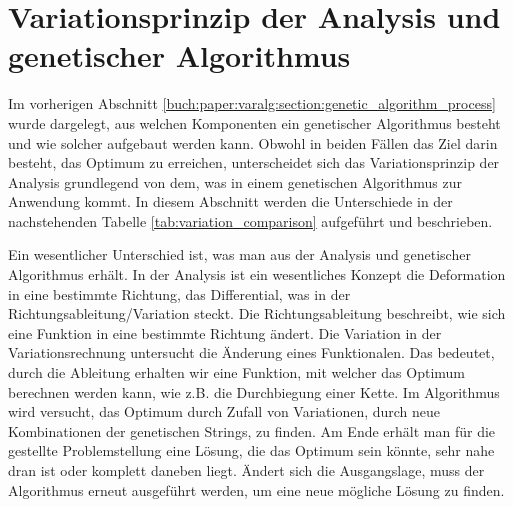 %
%
%
%
\section{Variationsprinzip der Analysis und genetischer Algorithmus
  \label{buch:paper:varalg:section:variations_analysis_algorithm_result}}
Im vorherigen Abschnitt \ref{buch:paper:varalg:section:genetic_algorithm_process}
wurde dargelegt, aus welchen Komponenten ein genetischer Algorithmus besteht und wie 
solcher aufgebaut werden kann. 
Obwohl in beiden Fällen das Ziel darin besteht, das Optimum zu erreichen, unterscheidet
sich das Variationsprinzip der Analysis grundlegend von dem, was in einem genetischen 
Algorithmus zur Anwendung kommt. In diesem Abschnitt werden die Unterschiede in der 
nachstehenden Tabelle \ref{tab:variation_comparison} aufgeführt und 
beschrieben.

Ein wesentlicher Unterschied ist, was man aus der Analysis und genetischer Algorithmus 
erhält. In der Analysis ist ein wesentliches Konzept die Deformation in eine bestimmte 
Richtung, das Differential, was in der Richtungsableitung/Variation steckt. Die Richtungsableitung 
beschreibt, wie sich eine Funktion in eine bestimmte Richtung ändert. Die Variation in  
der Variationsrechnung untersucht die Änderung eines Funktionalen. Das bedeutet, durch die Ableitung 
erhalten wir eine Funktion, mit welcher das Optimum berechnen werden kann, wie z.B. die  
Durchbiegung einer Kette. Im Algorithmus wird versucht, das Optimum durch Zufall von   
Variationen, durch neue Kombinationen der genetischen Strings, zu finden. Am 
Ende erhält man für die gestellte Problemstellung eine Lösung, die das Optimum sein könnte,  
sehr nahe dran ist oder komplett daneben liegt. Ändert sich die Ausgangslage, muss der Algorithmus 
erneut ausgeführt werden, um eine neue mögliche Lösung zu finden. 

